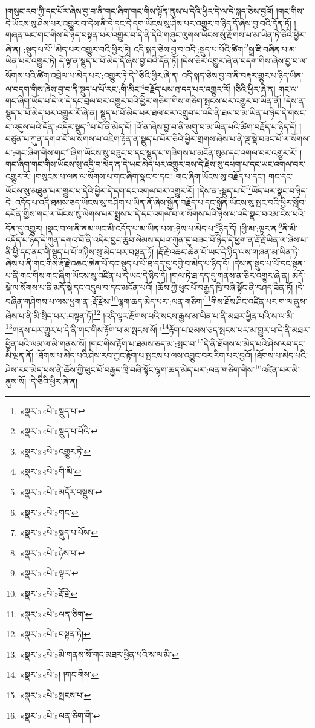 །གསུང་རབ་ཀྱི་དང་པོར་ཞེས་བྱ་བ་ནི་གང་ཞིག་གང་གིས་སྟོན་ནུས་པ་དེའི་ཕྱིར་དེ་ལ་དེ་སྐད་ཅེས་བྱའོ། །གང་གིས་དེ་ཡོངས་སུ་ཤེས་པར་འགྱུར་བ་དེས་ནི་དེ་དང་དེ་དག་ཡོངས་སུ་ཤེས་པར་འགྱུར་བ་ཉིད་དོ་ཞེས་བྱ་བའི་དོན་ཏོ། །གཞན་ཡང་གང་གིས་དེ་ཉིད་བསྟན་པར་འགྱུར་བ་དེ་ནི་དེའི་གཞུང་ལུགས་ཡོངས་སུ་རྫོགས་པ་མ་ཡིན་ཏེ་ཅིའི་ཕྱིར་ཞེ་ན། :སྡུད་པ་པོ་\footnote{«སྣར་»«པེ་»སྡུད་པ་}མེད་པར་འགྱུར་བའི་ཕྱིར་ཏེ། འདི་སྐད་ཅེས་བྱ་བ་འདི་:སྡུད་པ་པོའི་ཚིག་\footnote{«སྣར་»«པེ་»སྡུད་པ་པོའི་}སྒྲ་ཇི་བཞིན་པ་མ་ཡིན་པར་འགྱུར་ཏེ། དེ་ལྟ་ན་སྡུད་པ་པོ་མེད་དོ་ཞེས་བྱ་བའི་དོན་ཏོ། །དེས་ཅིར་འགྱུར་ཞེ་ན་བདག་གིས་ཞེས་བྱ་བ་ལ་སོགས་པའི་ཚིག་འབྲེལ་པ་མེད་པར་:འགྱུར་ཏེ་དེ་\footnote{«སྣར་»«པེ་»འགྱུར་ཏེ་}ཅིའི་ཕྱིར་ཞེ་ན། འདི་སྐད་ཅེས་བྱ་བ་ནི་བརྡར་གྱུར་པ་ཉིད་ཡིན་ལ་བདག་གིས་ཞེས་བྱ་བ་ནི་སྡུད་པ་པོ་རང་:གི་མིང་\footnote{«སྣར་»«པེ་»གི་མི་}བརྗོད་པས་ཐ་དད་པར་འགྱུར་རོ། །ཅིའི་ཕྱིར་ཞེ་ན། གང་ལ་གང་ཞིག་ཡོད་པ་དེ་ལ་དེ་དང་བྲལ་བར་འགྱུར་བའི་ཕྱིར་གཅིག་གིས་གཅིག་སྤངས་པར་འགྱུར་བ་ཡིན་ནོ། །དེས་ན་སྡུད་པ་པོ་མེད་པར་འགྱུར་རོ་ཞེ་ན། སྡུད་པ་པོ་མེད་པར་ཐལ་བར་འགྲུབ་པ་འདི་ནི་ཐལ་བ་མ་ཡིན་པ་ཉིད་དེ་གསང་བ་འདུས་པའི་དོན་:འདིར་སྡུད་\footnote{«སྣར་»«པེ་»མདོར་བསྡུས་}པ་པོ་ནི་མེད་དོ། །འོ་ན་ཞེས་བྱ་བ་ནི་མགུ་བ་མ་ཡིན་པའི་ཚིག་བརྗོད་པ་ཉིད་དོ། །བཙུན་པ་ཀུན་དགའ་བོ་ལ་སོགས་པ་འཇིག་རྟེན་ན་སྡུད་པ་པོར་ཅིའི་ཕྱིར་གྲགས་ཞེས་པ་ནི་ལྔ་སྡེ་བཟང་པོ་ལ་སོགས་པ་:གང་ཞིག་གིས་གང་\footnote{«སྣར་»«པེ་»གང་}ཞིག་ཡོངས་སུ་བཟུང་བ་དང་སྡུད་པ་གཟིགས་པ་མངོན་སུམ་དང་འགལ་བར་འགྱུར་རོ། །གང་ཞིག་གང་གིས་ཡོངས་སུ་འདྲི་བ་མེད་ན་དེ་ཡང་མེད་པར་འགྱུར་བས་དེ་རྗེས་སུ་དཔག་པ་དང་ཡང་འགལ་བར་འགྱུར་རོ། །གསུངས་པ་ལན་ལ་སོགས་པ་གང་ཞིག་སྣང་བ་དང་། གང་ཞིག་ཡོངས་སུ་བརྗོད་པ་དང་། གང་དང་ཡོངས་སུ་མཐུན་པར་གྱུར་པ་དེའི་ཕྱིར་དེ་དག་དང་འགལ་བར་འགྱུར་རོ། །དེས་ན་:སྡུད་པ་པོ་\footnote{«སྣར་»«པེ་»སྡུད་པ་པོས་}ཡོད་པར་སྣང་བ་ཉིད་དེ། འདོད་པ་འདི་ཐམས་ཅད་ཡོངས་སུ་བཤིག་པ་ཡིན་ནོ་ཞེས་སྐྱོན་བརྗོད་པ་དང་སྐྱོན་ཡོངས་སུ་སྤང་བའི་ཕྱིར་སློབ་དཔོན་གྱིས་གང་ལ་ཡོངས་སུ་ལེགས་པར་སྨྲས་པ་དེ་དང་འགལ་བ་ལ་སོགས་པའི་ཉེས་པ་འདི་སྣང་བའམ་ངེས་པའི་དོན་དུ་འགྱུར། །སྣང་བ་ལ་ནི་ནམ་ཡང་མི་འདོད་པ་མ་ཡིན་པས་:ཉེས་པ་མེད་པ་\footnote{«སྣར་»«པེ་»ཉེས་པ་}ཉིད་དོ། །ཕྱི་མ་:ལྟར་ན་\footnote{«སྣར་»«པེ་»ལྟར་}ནི་མི་འདོད་པ་ཉིད་དེ་ཀུན་དགའ་བོ་ནི་འདིར་བྱང་ཆུབ་སེམས་དཔའ་ཀུན་དུ་བཟང་པོ་ཉིད་དེ་ཕྱག་ན་རྡོ་རྗེ་ཡིན་ལ་ཞེས་པ་ནི་ཕྱི་དང་ནང་གི་སྡུད་པ་པོ་གཉིས་སུ་མེད་པར་བསྟན་ཏོ། །རྡོ་རྗེ་འཆང་ཆེན་པོ་ཡང་དེ་ཉིད་ལས་གཞན་མ་ཡིན་ཏེ་ཞེས་པ་ནི་གང་གིས་རྡོ་རྗེ་འཆང་ཆེན་པོ་དང་སྡུད་པ་པོ་ཐ་དད་དུ་དབྱེ་བ་མེད་པ་ཉིད་དོ། །དེས་ན་སྡུད་པ་པོ་དང་སྟན་པ་ནི་གང་གིས་གང་ཞིག་ཡོངས་སུ་འཛིན་པ་དེ་ཡང་དེ་ཉིད་དོ། །གལ་ཏེ་ཐ་དད་དུ་གནས་ན་ཅིར་འགྱུར་ཞེ་ན། མདོ་སྡེ་ལ་སོགས་པ་ནི་མདོ་སྡེ་དང་འདུལ་བ་དང་མངོན་པའོ། །ཆོས་ཀྱི་ཕུང་པོ་བརྒྱད་ཁྲི་བཞི་སྟོང་ནི་བཤད་ཟིན་ཏོ། །དེ་བཞིན་གཤེགས་པ་ལས་ཕྱག་ན་:རྡོ་རྗེས་\footnote{«སྣར་»«པེ་»རྡོ་རྗེ་}ལྷག་ཆད་མེད་པར་:ལན་གཅིག་\footnote{«སྣར་»«པེ་»ལན་ཅིག་}གིས་ཐོས་ཤིང་འཛིན་པར་ག་ལ་ནུས་ཞེས་པ་ནི་མི་སྲིད་པར་:བསྟན་ཏོ།\footnote{«སྣར་»«པེ་»བསྟན་ཏེ།} །འདི་ལྟར་རྫོགས་པའི་སངས་རྒྱས་མ་ཡིན་པ་ནི་མཐར་ཕྱིན་པའི་ས་ལ་མི་\footnote{«སྣར་»«པེ་»མི་གནས་སོ་གང་མཐར་ཕྱིན་པའི་ས་ལ་མི་}གནས་པར་གྱུར་པ་དེ་ནི་གང་གིས་རྟོག་པ་མ་སྤངས་སོ། །\footnote{«སྣར་»«པེ་»། །གང་གིས་}རྟོག་པ་ཐམས་ཅད་སྤངས་པར་མ་གྱུར་པ་དེ་ནི་མཐར་ཕྱིན་པའི་ལམ་ལ་མི་གནས་སོ། །གང་གིས་རྟོག་པ་ཐམས་ཅད་མ་:སྤང་བ་\footnote{«སྣར་»«པེ་»སྤངས་པ་}དེ་ནི་ཐོགས་པ་མེད་པའི་ཤེས་རབ་དང་མི་ལྡན་ནོ། །ཐོགས་པ་མེད་པའི་ཤེས་རབ་ཀྱང་རྟོག་པ་སྤངས་པ་ལས་འབྱུང་བར་རིག་པར་བྱའོ། །ཐོགས་པ་མེད་པའི་ཤེས་རབ་མེད་པས་ནི་ཆོས་ཀྱི་ཕུང་པོ་བརྒྱད་ཁྲི་བཞི་སྟོང་ལྷག་ཆད་མེད་པར་:ལན་གཅིག་གིས་\footnote{«སྣར་»«པེ་»ལན་ཅིག་གི་}འཛིན་པར་མི་ནུས་སོ། །དེ་ཅིའི་ཕྱིར་ཞེ་ན། 